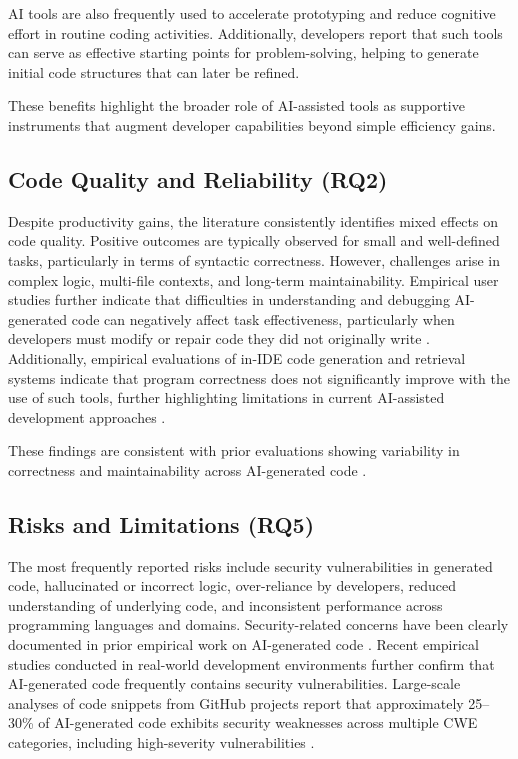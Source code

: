 \documentclass[conference]{IEEEtran}
\begin{document}
AI tools are also frequently used to accelerate prototyping and reduce cognitive effort in routine coding activities. Additionally, developers report that such tools can serve as effective starting points for problem-solving, helping to generate initial code structures that can later be refined.

These benefits highlight the broader role of AI-assisted tools as supportive instruments that augment developer capabilities beyond simple efficiency gains.

\subsection{Code Quality and Reliability (RQ2)}

Despite productivity gains, the literature consistently identifies mixed effects on code quality. Positive outcomes are typically observed for small and well-defined tasks, particularly in terms of syntactic correctness. However, challenges arise in complex logic, multi-file contexts, and long-term maintainability. Empirical user studies further indicate that difficulties in understanding and debugging AI-generated code can negatively affect task effectiveness, particularly when developers must modify or repair code they did not originally write \cite{vaithilingam2022usability}. Additionally, empirical evaluations of in-IDE code generation and retrieval systems indicate that program correctness does not significantly improve with the use of such tools, further highlighting limitations in current AI-assisted development approaches \cite{xu2022nl2code}.

These findings are consistent with prior evaluations showing variability in correctness and maintainability across AI-generated code \cite{yetistiren2023evaluation}.

\subsection{Risks and Limitations (RQ5)}

The most frequently reported risks include security vulnerabilities in generated code, hallucinated or incorrect logic, over-reliance by developers, reduced understanding of underlying code, and inconsistent performance across programming languages and domains. Security-related concerns have been clearly documented in prior empirical work on AI-generated code \cite{pearce2022security}. Recent empirical studies conducted in real-world development environments further confirm that AI-generated code frequently contains security vulnerabilities. Large-scale analyses of code snippets from GitHub projects report that approximately 25--30\% of AI-generated code exhibits security weaknesses across multiple CWE categories, including high-severity vulnerabilities \cite{fu2025security}. 
\end{document}
